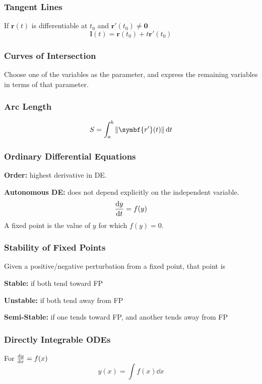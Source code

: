 \documentclass{article}
\begin{document}
\begin{multicols}{3}
    \subsubsection*{Tangent Lines}
    If $\symbf{r}(t)$ is differentiable at
    $t_0$ and $\symbf{r'}(t_0)\ne\symbf{0}$
    \begin{equation*}
        \symbf{l}(t) = \symbf{r}(t_0)+t\symbf{r'}(t_0)
    \end{equation*}
    \subsubsection*{Curves of Intersection}
    Choose one of the variables as the parameter, and express the remaining variables in terms of that parameter.
    \subsubsection*{Arc Length}
    \begin{equation*}
        S = \int_a^b \norm{\symbf{r'}(t)} \dd{t}
    \end{equation*}
    \subsubsection*{Ordinary Differential Equations}
    \textbf{Order:} highest derivative in DE.

    \textbf{Autonomous DE:} does not depend explicitly on the independent variable.
    \begin{equation*}
        \dv{y}{t} = f(y)
    \end{equation*}
    A fixed point is the value of $y$ for which $f(y) = 0$.
    \subsubsection*{Stability of Fixed Points}
    Given a positive/negative perturbation from a fixed point, that point is

    \textbf{Stable:} if both tend toward FP

    \textbf{Unstable:} if both tend away from FP

    \textbf{Semi-Stable:} if one tends toward FP, and another tends away from FP
    \subsubsection*{Directly Integrable ODEs}
    For $\dv{y}{x} = f(x)$
    \begin{equation*}
        y(x) = \int f(x) \dd{x}
    \end{equation*}

\end{multicols}
\end{document}
